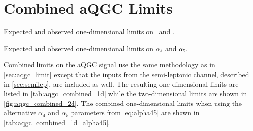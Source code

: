 
\section{Combined aQGC Limits}
\label{sec:combined_aqgc}


\begin{table}[h!]
  \begin{center}
  
    \caption{Expected and observed one-dimensional limits on \fszero~and \fsone.}
    \label{tab:aqgc_combined_1d}

  \end{center}

\end{table}
\begin{table}[h!]
  \begin{center}
  
    \caption{Expected and observed one-dimensional limits on $\alpha_4$ and $\alpha_5$.}
    \label{tab:aqgc_combined_1d_alpha45}

  \end{center}
\end{table}


Combined limits on the aQGC signal use the same methodology
as in \sec\ref{sec:aqgc_limit} except that the inputs from the semi-leptonic
channel, described in \sec\ref{sec:semilep}, are included as well.
The resulting one-dimensional limits are listed in \tab\ref{tab:aqgc_combined_1d}
while the two-dimensional limits are shown in \fig\ref{fig:aqgc_combined_2d}.
The combined one-dimensional limits 
when using the alternative $\alpha_4$ and $\alpha_5$ parameters from \eqn\eqref{eq:alpha45}
are shown in \tab\ref{tab:aqgc_combined_1d_alpha45}.



